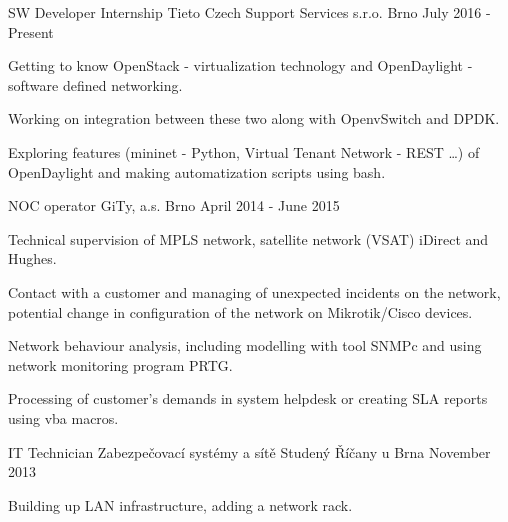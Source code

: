 

\begin{cventries}

  \cventry
    {SW Developer Internship}
    {Tieto Czech Support Services s.r.o.}
    {Brno}
    {July 2016 - Present}
    {
      \begin{cvitems}
       \item {Getting to know OpenStack - virtualization technology and OpenDaylight - software defined networking.}
       \item {Working on integration between these two along with OpenvSwitch and DPDK.}
       \item {Exploring features (mininet - Python, Virtual Tenant Network - REST \dots) of OpenDaylight and making automatization scripts using bash.}
      \end{cvitems}
    }
  \cventry
    {NOC operator} %
    {GiTy, a.s.} %
    {Brno} %
    {April 2014 - June 2015} %
    {
      \begin{cvitems} %
	\item {Technical supervision of MPLS network, satellite network (VSAT) iDirect and Hughes.}
        \item {Contact with a customer and managing of unexpected incidents on the network, potential change in configuration of the network on Mikrotik/Cisco devices.}     
        \item {Network behaviour analysis, including modelling with tool SNMPc and using network monitoring program PRTG.}     
        \item {Processing of customer's demands in system helpdesk or creating SLA reports using vba macros.}        
      \end{cvitems}
    }
   \cventry
   {IT Technician}
   {Zabezpečovací systémy a sítě Studený}
   {Říčany u Brna}
   {November 2013}
   {
    \begin{cvitems}
      \item {Building up LAN infrastructure, adding a network rack.}
    \end{cvitems}
}
\end{cventries}
